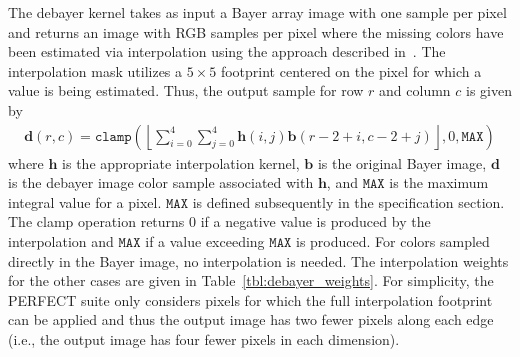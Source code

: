 \documentclass{report}
\begin{document}
The debayer kernel takes as input a Bayer array image with one sample
per pixel and returns an image with RGB samples per pixel where the
missing colors have been estimated via interpolation using the approach
described in~\cite{MalvarICASSP2004}.
The interpolation mask utilizes a $5 \times 5$ footprint centered on
the pixel for which a value is being estimated.
Thus, the output sample for row $r$ and column $c$ is given by
\begin{align}
    \mathbf{d}(r,c) = \mathtt{clamp}\left(\left\lfloor \sum_{i=0}^{4} \sum_{j=0}^{4} \mathbf{h}(i,j) \mathbf{b}(r-2+i, c-2+j) \right\rfloor, 0, \texttt{MAX} \right)
    \label{eq:debayer}
\end{align}
where $\mathbf{h}$ is the appropriate interpolation kernel,
$\mathbf{b}$ is the original Bayer image, $\mathbf{d}$ is the
debayer image color sample associated with $\mathbf{h}$, and
$\texttt{MAX}$ is the maximum integral value for a pixel.
$\texttt{MAX}$ is defined subsequently in the specification section.
The clamp operation returns 0 if a negative value is produced by
the interpolation and $\texttt{MAX}$ if a value exceeding
$\texttt{MAX}$ is produced.
For colors sampled directly in the Bayer image, no interpolation is needed.
The interpolation weights for the other cases are given in Table~\ref{tbl:debayer_weights}.
For simplicity, the PERFECT suite only considers pixels for which the full interpolation
footprint can be applied and thus the output image has two fewer pixels along each edge
(i.e., the output image has four fewer pixels in each dimension).
\end{document}
